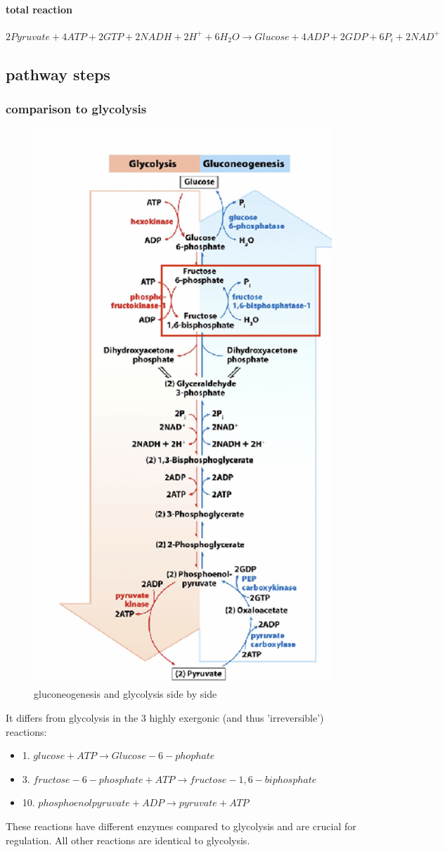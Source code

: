 \documentclass[../main.tex]{subfiles}
\begin{document}
\paragraph{total reaction}
$2 Pyruvate + 4 ATP + 2 GTP + 2 NADH + 2 H^{+} + 6 H_2O \rightarrow 
Glucose + 4 ADP + 2 GDP + 6 P_i + 2 NAD^{+}$

\subsection{pathway steps}
\subsubsection{comparison to glycolysis}
\begin{figure}[H]
    \centering
    \includegraphics[width=0.5\linewidth]{GlycolysisComparison.png}
    \caption{gluconeogenesis and glycolysis side by side}
    \label{fig:enter-label}
\end{figure}
It differs from glycolysis in the 3 highly exergonic (and thus 'irreversible') reactions:
\begin{itemize}
    \item 1. $glucose + ATP \rightarrow Glucose-6-phophate$
    \item 3. $ fructose-6-phosphate + ATP \rightarrow fructose-1,6-biphosphate$
    \item 10. $ phosphoenolpyruvate + ADP \rightarrow pyruvate + ATP$
\end{itemize}
These reactions have different enzymes compared to glycolysis and are crucial for regulation. All other reactions are identical to glycolysis. 
\end{document}
